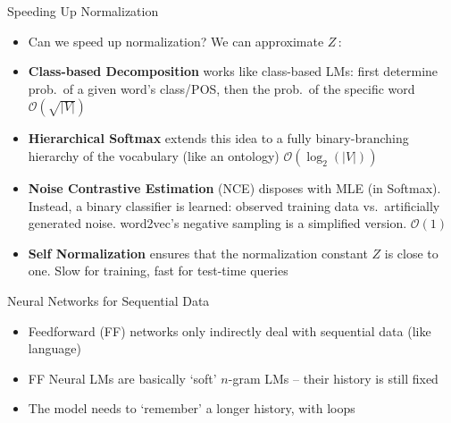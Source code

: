 \documentclass[xcolor=pdftex,x11names,table,hyperref]{beamer}
\newcommand{\detail}[1]{{\color{lightgrey}\small{}#1}}
\begin{document}
\begin{frame}{Speeding Up Normalization}
\begin{itemize}[<+->]
	\item Can we speed up normalization? We can approximate $Z$\,:
	\item \textbf{Class-based Decomposition} works like class-based LMs: first determine prob.\ of a given word's class/POS, then the prob.\ of the specific word \detail{$\mathcal{O} ( \sqrt{|V|} )$}
	\item \textbf{Hierarchical Softmax} extends this idea to a fully binary-branching hierarchy of the vocabulary (like an ontology) \detail{$\mathcal{O} (\log_2(|V|) ) $ }
	\item \textbf{Noise Contrastive Estimation} (NCE) disposes with MLE (in Softmax).  Instead, a binary classifier is learned: observed training data vs.\ artificially generated noise.  word2vec's negative sampling is a simplified version. \detail{$\mathcal{O} (1) $}
	\item \textbf{Self Normalization} ensures that the normalization constant $Z$ is close to one. Slow for training, fast for test-time queries
\end{itemize}
\end{frame}


\begin{frame}{Neural Networks for Sequential Data}
\begin{itemize}
	\item Feedforward (FF) networks only indirectly deal with sequential data (like language)
	\item FF Neural LMs are basically `soft' $n$-gram LMs -- their history is still fixed
	\pause
	\item The model needs to `remember' a longer history, with loops
\end{itemize}

%
\end{frame}
\end{document}
